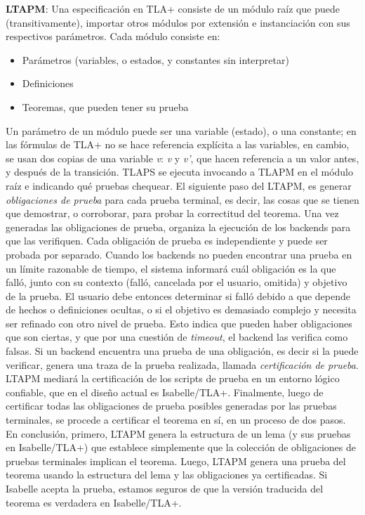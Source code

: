 \documentclass[spanish]{llncs}
\begin{document}
  \textbf{LTAPM}: Una especificación en TLA+ consiste de un módulo raíz que puede (transitivamente), importar otros módulos por extensión e instanciación con
  sus respectivos parámetros. Cada módulo consiste en:
  \begin{itemize}
   \item Parámetros (variables, o estados, y constantes sin interpretar)
   \item Definiciones
   \item Teoremas, que pueden tener su prueba
  \end{itemize}
  Un parámetro de un módulo puede ser una variable (estado), o una constante; en las fórmulas de TLA+ no se hace referencia explícita a las variables, en cambio, se usan dos copias de una variable \textit{v}: \textit{v} y \textit{v'}, que hacen referencia a un valor antes, y después de la transición. 
  TLAPS se ejecuta invocando a TLAPM en el módulo raíz e indicando qué pruebas chequear. 
  El siguiente paso del LTAPM, es generar \textit{obligaciones de prueba} para cada prueba terminal, es decir, las cosas que se tienen que demostrar, o corroborar, para probar la correctitud del teorema. Una vez generadas las obligaciones de prueba, organiza la ejecución de los backends para que las verifiquen.
  Cada obligación de prueba es independiente y puede ser probada por separado. Cuando los backends no pueden encontrar una prueba en un límite razonable de tiempo, el sistema informará cuál obligación es la que falló, junto con su contexto (falló, cancelada por el usuario, omitida) y objetivo de la prueba.
  El usuario debe entonces determinar si falló debido a que depende de hechos o definiciones ocultas, o si el objetivo es demasiado complejo y necesita ser refinado con otro nivel de prueba. Esto indica que pueden haber obligaciones que son ciertas, y que por una cuestión de \textit{timeout},
  el backend las verifica como falsas.
  Si un backend encuentra una prueba de una obligación, es decir si la puede verificar, genera una traza de la prueba realizada, llamada \textit{certificación de prueba}. LTAPM  mediará la certificación de los scripts de prueba en un entorno lógico confiable, que en el diseño actual es Isabelle/TLA+.
  Finalmente, luego de certificar todas las obligaciones de prueba posibles generadas por las pruebas
  terminales, se procede a certificar el teorema en sí, en un proceso de dos pasos. 
  En conclusión, primero, LTAPM genera la estructura de un lema (y sus pruebas en Isabelle/TLA+) que establece simplemente que la colección de
  obligaciones de pruebas terminales implican el teorema. Luego, LTAPM genera una prueba del teorema usando la estructura del lema y las obligaciones ya certificadas. Si Isabelle acepta la prueba, estamos seguros de que la versión traducida del teorema es verdadera en Isabelle/TLA+.\cite{verifyingsafety}
\end{document}
